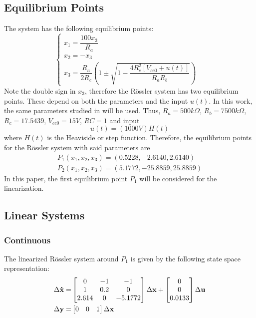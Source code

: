 \subsection{Equilibrium Points}
The system has the following equilibrium points:
\begin{equation}
    \begin{cases}
    x_1 = \dfrac{100x_3}{R_a}&\\
    x_2 = -x_3&\\
    x_3 = \dfrac{R_a}{2R_c}\left(1\pm\sqrt{1-\dfrac{4R_c^2\left[V_{cc0}+u(t)\right]}{R_aR_b}}\right)
    \end{cases}
\end{equation}
Note the double sign in $x_3$, therefore the Rössler system has two equilibrium points. These depend on both the parameters and the input $u(t)$. In this work, the same parameters studied in \cite{JS_PL1} will be used. Thus, $R_a=500k\Omega$, $R_b=7500k\Omega$, $R_c=17.5439$, $V_{cc0}=15V$, $RC = 1$ and input
\begin{equation}\label{eq:refInput}
    u(t) = (1000V)H(t)
\end{equation}
where $H(t)$ is the Heaviside or step function. Therefore, the equilibrium points for the Rössler system with said parameters are
\begin{equation}\label{eq:operPoints}
    \begin{split}
        P_1(x_1,x_2,x_3)=(0.5228,-2.6140,2.6140)\\
        P_2(x_1,x_2,x_3)=(5.1772,-25.8859,25.8859)
    \end{split}
\end{equation}
In this paper, the first equilibrium point $P_1$ will be considered for the linearization.

\subsection{Linear Systems}
\subsubsection{Continuous}
The linearized Rössler system around $P_1$ is given by the following state space representation:
\begin{equation}\label{eq:LinearizedModel}
\begin{split}
    \Delta\mathbf{\dot{x}} =& \begin{bmatrix}
0 & -1 & -1\\
1 &0.2 & 0\\
2.614 & 0 & -5.1772
\end{bmatrix} \Delta\mathbf{x}+\begin{bmatrix}
0\\
0\\
0.0133 
\end{bmatrix}\Delta\mathbf{u}\\\vspace{5mm}
    \Delta\mathbf{y}=&\begin{bmatrix}
0 & 0 & 1
\end{bmatrix}\Delta\mathbf{x}
\end{split}
\end{equation}

